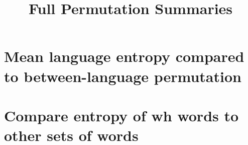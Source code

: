 \documentclass[10pt,a4paper,landscape]{article}
\title{Full Permutation Summaries}
\author{}
\date{} %
\begin{document}
\maketitle

\section{Mean language entropy compared to between-language permutation}


\clearpage
\newpage
\section{Compare entropy of wh words to other sets of words}




\end{document}
